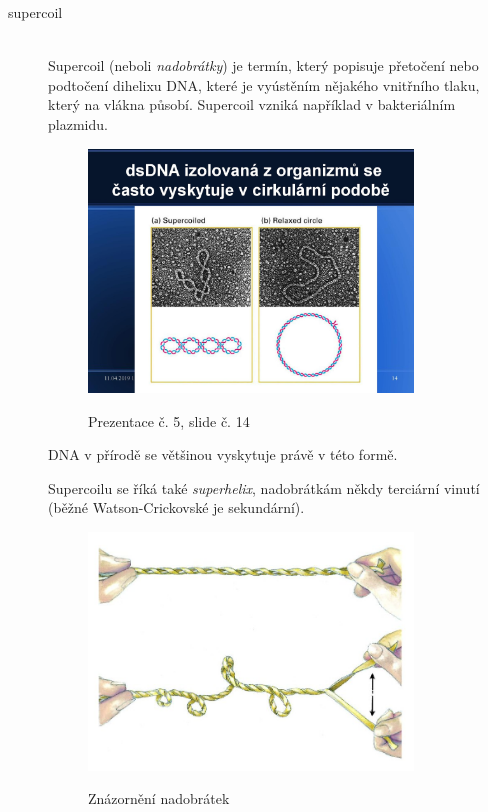 \documentclass[DIV=8]{scrreprt}
\begin{document}
\begin{description}
\item[supercoil]\hfill \\
Supercoil (neboli \emph{nadobrátky}) je termín, který popisuje přetočení nebo podtočení dihelixu DNA, které je vyústěním nějakého vnitřního tlaku, který na vlákna působí. Supercoil vzniká například v bakteriálním plazmidu. \begin{figure}
    \caption{Prezentace č. 5, slide č. 14}
    \includegraphics[width=0.85\textwidth]{slides-5/slide-14.jpg}
    \centering
    \label{slides-5-slide-14}
\end{figure}
 DNA v přírodě se většinou vyskytuje právě v této formě.

Supercoilu se říká také \emph{superhelix}, nadobrátkám někdy terciární vinutí (běžné Watson-Crickovské je sekundární).
\begin{figure}
    \caption{Znázornění nadobrátek}
    \includegraphics[width=0.85\textwidth]{supercoil.jpg}
    \centering
    \label{}
\end{figure}




\end{description}
\end{document}
